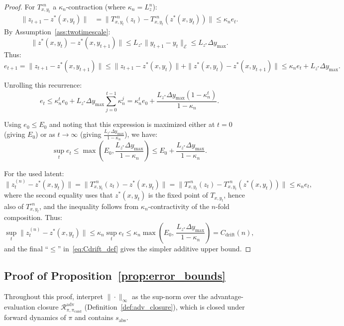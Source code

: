 \documentclass{article}
\theoremstyle{plain}
\theoremstyle{definition}
\theoremstyle{remark}
\newcommand{\Cdrift}{C_{\mathrm{drift}}}
\begin{document}
\begin{proof}
For $T_{x,y_t}^{\circ n}$ a $\kappa_n$-contraction (where $\kappa_n = L_z^n$):
\begin{align*}
\|z_{t+1} - z^*(x,y_t)\| &= \|T_{x,y_t}^{\circ n}(z_t) - T_{x,y_t}^{\circ n}(z^*(x,y_t))\| \le \kappa_n e_t.
\end{align*}
By Assumption~\ref{ass:twotimescale}:
\[
\|z^*(x,y_t) - z^*(x,y_{t+1})\| \le L_{z^*}\|y_{t+1}-y_t\|_{\mathcal{E}} \le L_{z^*}\Delta y_{\max}.
\]
Thus:
\[
e_{t+1} = \|z_{t+1} - z^*(x,y_{t+1})\| \le \|z_{t+1} - z^*(x,y_t)\| + \|z^*(x,y_t) - z^*(x,y_{t+1})\| \le \kappa_n e_t + L_{z^*}\Delta y_{\max}.
\]

Unrolling this recurrence:
\[
e_t \le \kappa_n^t e_0 + L_{z^*}\Delta y_{\max} \sum_{j=0}^{t-1} \kappa_n^j = \kappa_n^t e_0 + \frac{L_{z^*}\Delta y_{\max}(1 - \kappa_n^t)}{1-\kappa_n}.
\]

Using $e_0 \le E_0$ and noting that this expression is maximized either at $t=0$ (giving $E_0$) or as $t \to \infty$ (giving $\frac{L_{z^*}\Delta y_{\max}}{1-\kappa_n}$), we have:
\[
\sup_t e_t \le \max\left(E_0, \frac{L_{z^*}\Delta y_{\max}}{1-\kappa_n}\right) \le E_0 + \frac{L_{z^*}\Delta y_{\max}}{1-\kappa_n}.
\]

For the used latent:
\[
\|z_t^{(n)} - z^*(x,y_t)\| = \|T_{x,y_t}^{\circ n}(z_t) - z^*(x,y_t)\|
= \|T_{x,y_t}^{\circ n}(z_t) - T_{x,y_t}^{\circ n}(z^*(x,y_t))\| \le \kappa_n e_t,
\]
where the second equality uses that $z^*(x,y_t)$ is the fixed point of $T_{x,y_t}$,
hence also of $T_{x,y_t}^{\circ n}$, and the inequality follows from
$\kappa_n$-contractivity of the $n$-fold composition.
Thus:
\[
\sup_t \|z_t^{(n)} - z^*(x,y_t)\|
\le
\kappa_n \sup_t e_t
\le
\kappa_n \max\!\left(E_0,\,\frac{L_{z^*}\Delta y_{\max}}{1-\kappa_n}\right)
=
\Cdrift(n),
\]
and the final ``$\le$'' in~\eqref{eq:Cdrift_def} gives the simpler additive upper bound.
\end{proof}

\subsection{Proof of Proposition~\ref{prop:error_bounds}}
Throughout this proof, interpret $\|\cdot\|_\infty$ as the sup-norm over the advantage-evaluation closure $\mathcal{R}_{\pi,\pi_{\mathrm{cand}}}^{\mathrm{adv}}$ (Definition~\ref{def:adv_closure}), which is closed under forward dynamics of $\pi$ and contains $s_{\mathrm{abs}}$.
\end{document}
